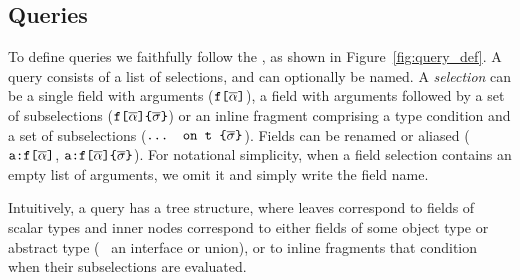 


\subsection{Queries}\label{subsec:query}



To define queries we faithfully follow the \spec, as shown in
Figure~\ref{fig:query_def}. A query consists of a list of selections, and can optionally be named.
A \emph{selection} can be a single field with arguments ($\texttt{f[}\overline{\alpha}\texttt{]}$), a field
with arguments followed by a set of subselections
($\texttt{f[}\overline{\alpha}\texttt{]} \texttt{\{} \overline{\sigma} \texttt{\}}$) or an inline fragment
comprising a type condition and a set of subselections
($\texttt{... on t \{}\overline{\sigma}\texttt{\}}$). Fields can be renamed or aliased ($\texttt{a:}\texttt{f[}\overline{\alpha}\texttt{]}$, $\texttt{a:}\texttt{f[}\overline{\alpha}\texttt{]} \texttt{\{} \overline{\sigma} \texttt{\}}$). For
notational simplicity, when a field selection contains an empty list
of arguments, we omit it and simply write the field name.



Intuitively, a query has a tree structure, where leaves correspond to
fields of scalar types and inner nodes correspond to either fields of
some object type or abstract type (\ie~ an interface or union),
or to inline fragments that condition when their subselections are evaluated. 

